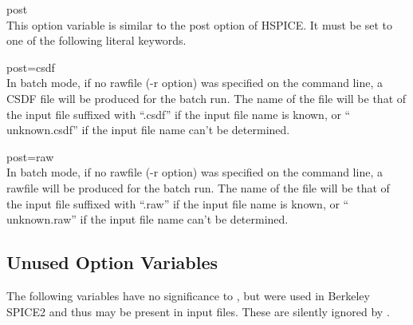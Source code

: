 \begin{description}
\item{\et post}\\
This option variable is similar to the {\vt post} option of HSPICE. 
It must be set to one of the following literal keywords.

\begin{description}
\item{\vt post=csdf}\\
In batch mode, if no rawfile ({\vt -r} option) was specified on the
{\WRspice} command line, a CSDF file will be produced for the batch
run.  The name of the file will be that of the input file suffixed
with ``{\vt .csdf}'' if the input file name is known, or ``{\vt
unknown.csdf}'' if the input file name can't be determined.

\item{\vt post=raw}\\
In batch mode, if no rawfile ({\vt -r} option) was specified on the
{\WRspice} command line, a rawfile will be produced for the batch run. 
The name of the file will be that of the input file suffixed with
``{\vt .raw}'' if the input file name is known, or ``{\vt
unknown.raw}'' if the input file name can't be determined.
\end{description}
\end{description}

\subsection{Unused Option Variables}

The following variables have no significance to {\WRspice}, but were
used in Berkeley SPICE2 and thus may be present in input files.  These
are silently ignored by {\WRspice}.

